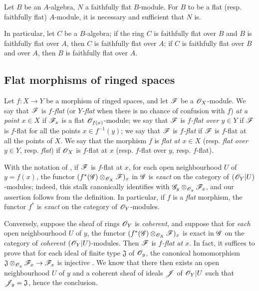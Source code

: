 \begin{env}[6.6.4]
\label{0.6.6.4}
Let $B$ be an $A$-algebra, $N$ a faithfully flat $B$-module. For $B$ to be a flat
(resp. faithfully flat) $A$-module, it is necessary and sufficient that $N$ is.

In particular, let $C$ be a $B$-algebra; if the ring $C$ is faithfully flat over $B$ and $B$
is faithfully flat over $A$, then $C$ is faithfully flat over $A$; if $C$ is faithfully flat
over $B$ and over $A$, then $B$ is faithfully flat over $A$.
\end{env}

\subsection{Flat morphisms of ringed spaces}
\label{subsection:0.6.7}

\begin{env}[6.7.1]
\label{0.6.7.1}
Let $f:X\to Y$ be a morphism of ringed spaces, and let $\mathscr{F}$ be a $\mathscr{O}_X$-module. We say
that $\mathscr{F}$ is \emph{$f$-flat} (or \emph{$Y$-flat} when there is no chance of confusion
with $f$) \emph{at a point $x\in X$} if $\mathscr{F}_x$ is a flat $\mathscr{O}_{f(x)}$-module; we say that
$\mathscr{F}$ is \emph{$f$-flat over $y\in Y$} if $\mathscr{F}$ is $f$-flat for all the points
$x\in f^{-1}(y)$; we say that $\mathscr{F}$ is \emph{$f$-flat} if $\mathscr{F}$ is $f$-flat at all the
points of $X$. We say that the morphism $f$ is \emph{flat at $x\in X$} (resp. \emph{flat over
$y\in Y$}, resp. \emph{flat}) if $\mathscr{O}_X$ is $f$-flat at $x$ (resp. $f$-flat over $y$, resp.
$f$-flat).
\end{env}

\begin{env}[6.7.2]
\label{0.6.7.2}
With the notation of , if $\mathscr{F}$ is $f$-flat at $x$, for each open
neighbourhood $U$ of $y=f(x)$, the functor $(f^*(\mathscr{G})\otimes_{\mathscr{O}_X}\mathscr{F})_x$ in $\mathscr{G}$
is \emph{exact} on the category of $(\mathscr{O}_Y|U)$-modules; indeed, this stalk canonically
identifies with $\mathscr{G}_y\otimes_{\mathscr{O}_y}\mathscr{F}_x$, and our assertion follows from the
definition. In particular, if $f$ is a \emph{flat} morphism, the functor $f^*$ is
\emph{exact} on the category of $\mathscr{O}_Y$-modules.
\end{env}

\begin{env}[6.7.3]
\label{0.6.7.3}
Conversely, suppose the sheaf of rings $\mathscr{O}_Y$ is \emph{coherent}, and suppose that for
\emph{each} open neighbourhood $U$ of $y$, the functor $(f^*(\mathscr{G})\otimes_{\mathscr{O}_X}\mathscr{F})_x$
is exact in $\mathscr{G}$ on the category of \emph{coherent} $(\mathscr{O}_Y|U)$-modules. Then $\mathscr{F}$ is
\emph{$f$-flat at $x$}. In fact, it suffices to prove that for each ideal of finite type
$\mathfrak{J}$ of $\mathscr{O}_y$, the canonical homomorphism
$\mathfrak{J}\otimes_{\sh{O}_y}\sh{F}_x\to\sh{F}_x$ is injective . We know
 that there then exists an open neighbourhood
$U$ of $y$ and a coherent sheaf of ideals $\mathscr{J}$ of $\mathscr{O}_Y|U$ such that
$\mathscr{J}_y=\mathfrak{J}$, hence the conclusion.
\end{env}

